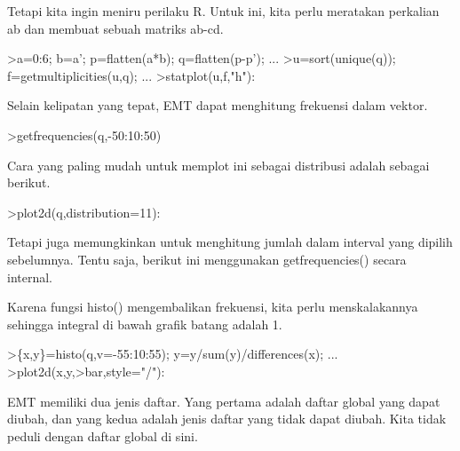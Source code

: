 \documentclass[12pt,Times new roman,letterpaper]{book}
\begin{document}
\begin{eulernootebook}
\begin{eulercomment}
\begin{eulercomment}
\begin{eulernootebook}
\begin{eulercomment}
\begin{eulercomment}
\begin{eulercomment}
\begin{eulercomment}
\begin{eulercomment}
\begin{eulercomment}
\begin{eulercomment}
\begin{eulercomment}
\begin{eulercomment}
\begin{eulercomment}
\begin{eulercomment}
\begin{eulercomment}
Tetapi kita ingin meniru perilaku R. Untuk ini, kita perlu meratakan
perkalian ab dan membuat sebuah matriks ab-cd.
\end{eulercomment}
\begin{eulerprompt}
>a=0:6; b=a'; p=flatten(a*b); q=flatten(p-p'); ...
>u=sort(unique(q)); f=getmultiplicities(u,q); ...
>statplot(u,f,"h"):
\end{eulerprompt}
\begin{eulercomment}
Selain kelipatan yang tepat, EMT dapat menghitung frekuensi dalam
vektor.
\end{eulercomment}
\begin{eulerprompt}
>getfrequencies(q,-50:10:50)
\end{eulerprompt}
\begin{euleroutput}
  [0,  23,  132,  316,  602,  801,  333,  141,  53,  0]
\end{euleroutput}
\begin{eulercomment}
Cara yang paling mudah untuk memplot ini sebagai distribusi adalah
sebagai berikut.
\end{eulercomment}
\begin{eulerprompt}
>plot2d(q,distribution=11):
\end{eulerprompt}
\begin{eulercomment}
Tetapi juga memungkinkan untuk menghitung jumlah dalam interval yang
dipilih sebelumnya. Tentu saja, berikut ini menggunakan
getfrequencies() secara internal.

Karena fungsi histo() mengembalikan frekuensi, kita perlu
menskalakannya sehingga integral di bawah grafik batang adalah 1.
\end{eulercomment}
\begin{eulerprompt}
>\{x,y\}=histo(q,v=-55:10:55); y=y/sum(y)/differences(x); ...
>plot2d(x,y,>bar,style="/"):
\end{eulerprompt}
\begin{eulercomment}
EMT memiliki dua jenis daftar. Yang pertama adalah daftar global yang
dapat diubah, dan yang kedua adalah jenis daftar yang tidak dapat
diubah. Kita tidak peduli dengan daftar global di sini.


\end{eulercomment}
\end{eulercomment}
\end{eulercomment}
\end{eulercomment}
\end{eulercomment}
\end{eulercomment}
\end{eulercomment}
\end{eulercomment}
\end{eulercomment}
\end{eulercomment}
\end{eulercomment}
\end{eulercomment}
\end{eulernootebook}
\end{eulercomment}
\end{eulercomment}
\end{eulernootebook}
\end{document}
